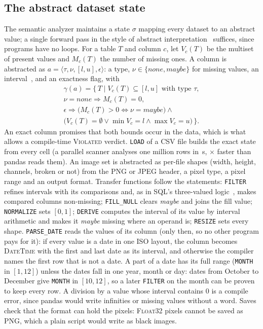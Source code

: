 \subsection{The abstract dataset state}\label{sec:state}
The semantic analyzer maintains a state $\sigma$ mapping every dataset to an abstract value; a
single forward pass in the style of abstract interpretation~\cite{cousot1977} suffices, since
programs have no loops. For a table $T$ and column $c$, let $V_c(T)$ be the multiset of present
values and $M_c(T)$ the number of missing ones. A column is abstracted as
$a = \langle \tau, \nu, [l,u], \epsilon \rangle$: a type, $\nu \in \{\textit{none},
\textit{maybe}\}$ for missing values, an interval~\cite{cousot1976}, and an exactness flag, with
\begin{multline*}
\gamma(a) = \{\, T \mid V_c(T) \subseteq [l,u] \text{ with type } \tau, \\
  \nu = \textit{none} \Rightarrow M_c(T) = 0, \\
  \epsilon \Rightarrow \big(M_c(T) > 0 \Leftrightarrow \nu = \textit{maybe}\big) \wedge {} \\
  \big(V_c(T) = \emptyset \vee \min V_c = l \wedge \max V_c = u\big) \,\}.
\end{multline*}
An exact column promises that both bounds occur in the data, which is what allows a compile-time
\textsc{Violated} verdict. \texttt{LOAD} of a CSV file builds the exact state from every cell (a
parallel scanner analyses one million rows in \CsvMillion\,s, \CsvSpeedup$\times$ faster than
pandas reads them). An image set is abstracted as per-file shapes (width, height, channels, broken
or not) from the PNG or JPEG header, a pixel type, a pixel range and an output format. Transfer
functions follow the statements: \texttt{FILTER} refines intervals with its comparisons and, as in
SQL's three-valued logic~\cite{codd1979}, makes compared columns non-missing; \texttt{FILL\_NULL}
clears \textit{maybe} and joins the fill value; \texttt{NORMALIZE} sets $[0,1]$; \texttt{DERIVE}
computes the interval of its value by interval arithmetic and makes it \textit{maybe} missing where an
operand is; \texttt{RESIZE} sets every shape. \texttt{PARSE\_DATE} reads the values of its column (only
then, so no other program pays for it): if every value is a date in one ISO layout, the column becomes
\textsc{DateTime} with the first and last date as its interval, and otherwise the compiler names the
first row that is not a date. A part of a date has its full range (\texttt{MONTH} in $[1,12]$) unless
the dates fall in one year, month or day: dates from October to December give \texttt{MONTH} in
$[10,12]$, so a later \texttt{FILTER} on the month can be proven to keep every row. A division by a
value whose interval contains 0 is a compile error, since pandas would write infinities or missing
values without a word. Saves check that the format can hold the pixels: \textsc{Float32} pixels cannot
be saved as PNG, which a plain script would write as black images.

